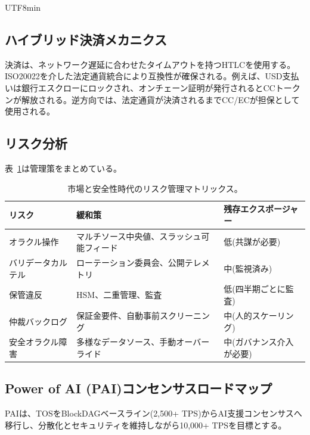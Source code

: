 \documentclass[11pt]{article}
\begin{document}
\begin{CJK}{UTF8}{min}
\subsection{ハイブリッド決済メカニクス}
決済は、ネットワーク遅延に合わせたタイムアウトを持つHTLCを使用する。ISO20022を介した法定通貨統合により互換性が確保される。例えば、USD支払いは銀行エスクローにロックされ、オンチェーン証明が発行されるとCCトークンが解放される。逆方向では、法定通貨が決済されるまでCC/ECが担保として使用される。

\subsection{リスク分析}
表~\ref{tab:risk-markets}は管理策をまとめている。

\begin{table}[H]
  \centering
  \begin{tabular}{p{}p{}p{}}
    \toprule
    \textbf{リスク} & \textbf{緩和策} & \textbf{残存エクスポージャー} \\
    \midrule
    オラクル操作 & マルチソース中央値、スラッシュ可能フィード & 低(共謀が必要) \\
    バリデータカルテル & ローテーション委員会、公開テレメトリ & 中(監視済み) \\
    保管違反 & HSM、二重管理、監査 & 低(四半期ごとに監査) \\
    仲裁バックログ & 保証金要件、自動事前スクリーニング & 中(人的スケーリング) \\
    安全オラクル障害 & 多様なデータソース、手動オーバーライド & 中(ガバナンス介入が必要) \\
    \bottomrule
  \end{tabular}
  \caption{市場と安全性時代のリスク管理マトリックス。}
  \label{tab:risk-markets}
\end{table}

\subsection{Power of AI (PAI)コンセンサスロードマップ}
\label{sec:pai-roadmap}
PAIは、TOSをBlockDAGベースライン(2,500+ TPS)からAI支援コンセンサスへ移行し、分散化とセキュリティを維持しながら10,000+ TPSを目標とする。


\end{CJK}
\end{document}
